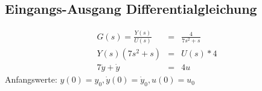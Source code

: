 \subsection{Eingangs-Ausgang Differentialgleichung}

\begin{eqnarray*}
    G(s) =\frac{Y(s)}{U(s)} &=& \frac{4}{7s^2+s} \\
    Y(s)(7s^2+s) &=& U(s) * 4 \\
     7 \ddot y +  \dot y &=& 4u
\end{eqnarray*}
Anfangswerte: \(y(0)=y_0, \dot y(0)=\dot y_0, u(0)=u_0\)
